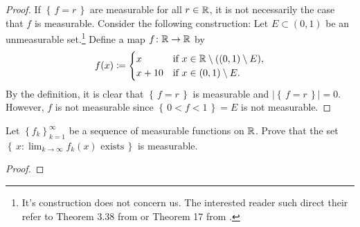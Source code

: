 \begin{proof}
If $\left\{\,f=r\,\right\}$ are measurable for all $r\in\mathbb{R}$, it is not
necessarily the case that $f$ is measurable. Consider the following
construction: Let $E\subset(0,1)$ be an unmeasurable set.\footnote{It's
  construction does not concern us. The interested reader such direct their
  refer to Theorem 3.38 from \cite[Ch.\@ 3, p.\@ 57-58]{wheeden-zygmund} or
  Theorem 17 from \cite[Ch.\@ 2\S 7, p.\@ 48]{royden}.} Define a map
$f\colon\mathbb{R}\to\mathbb{R}$ by
\begin{equation}
\label{eq:sp16:1:11}
f(x)\coloneqq
\begin{cases}
x&\text{if $x\in\mathbb{R}\setminus((0,1)\setminus E)$},\\
x+10&\text{if $x\in (0,1)\setminus E$.}
\end{cases}
\end{equation}
By the definition, it is clear that $\left\{\,f=r\,\right\}$ is measurable
and $\left|\left\{\,f=r\,\right\}\right|=0$. However, $f$ is not measurable
since $\left\{\,0<f<1\,\right\}=E$ is not measurable.
\end{proof}

\begin{problem}
Let $\left\{f_k\right\}_{k=1}^\infty$ be a sequence of measurable functions
on $\mathbb{R}$. Prove that the set
$\left\{\,x:\text{$\lim_{k\to\infty} f_k(x)$ exists}\,\right\}$
is measurable.
\end{problem}
\begin{proof}
\end{proof}

